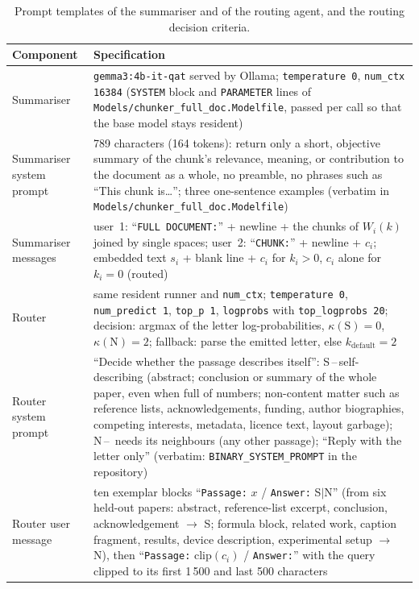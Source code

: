 \documentclass[pdflatex,sn-mathphys-num]{sn-jnl}
\theoremstyle{thmstyleone}%
\theoremstyle{thmstylethree}%
\begin{document}
\begin{table}[htbp]
\caption{Prompt templates of the summariser and of the routing agent, and the routing decision criteria.}\label{tab:prompts}
\begin{tabular}{@{}p{2.6cm}p{10.0cm}@{}}
\toprule
Component & Specification \\
\midrule
Summariser & \texttt{gemma3:4b-it-qat} served by Ollama; \texttt{temperature 0}, \texttt{num\_ctx 16384} (\texttt{SYSTEM} block and \texttt{PARAMETER} lines of \texttt{Models/chunker\_full\_doc.Modelfile}, passed per call so that the base model stays resident) \\
Summariser system prompt & 789 characters (164 tokens): return only a short, objective summary of the chunk's relevance, meaning, or contribution to the document as a whole, no preamble, no phrases such as ``This chunk is\ldots''; three one-sentence examples (verbatim in \texttt{Models/chunker\_full\_doc.Modelfile}) \\
Summariser messages & user~1: ``\texttt{FULL DOCUMENT:}'' + newline + the chunks of $W_i(k)$ joined by single spaces; user~2: ``\texttt{CHUNK:}'' + newline + $c_i$; embedded text $s_i$ + blank line + $c_i$ for $k_i>0$, $c_i$ alone for $k_i=0$ (routed) \\
Router & same resident runner and \texttt{num\_ctx}; \texttt{temperature 0}, \texttt{num\_predict 1}, \texttt{top\_p 1}, \texttt{logprobs} with \texttt{top\_logprobs 20}; decision: argmax of the letter log-probabilities, $\kappa(\mathrm S)=0$, $\kappa(\mathrm N)=2$; fallback: parse the emitted letter, else $k_{\mathrm{default}}=2$ \\
Router system prompt & ``Decide whether the passage describes itself'': S\,--\,self-describing (abstract; conclusion or summary of the whole paper, even when full of numbers; non-content matter such as reference lists, acknowledgements, funding, author biographies, competing interests, metadata, licence text, layout garbage); N\,--\, needs its neighbours (any other passage); ``Reply with the letter only'' (verbatim: \texttt{BINARY\_SYSTEM\_PROMPT} in the repository) \\
Router user message & ten exemplar blocks ``\texttt{Passage:} $x$ / \texttt{Answer:} S$\mid$N'' (from six held-out papers: abstract, reference-list excerpt, conclusion, acknowledgement $\to$ S; formula block, related work, caption fragment, results, device description, experimental setup $\to$ N), then ``\texttt{Passage:} $\mathrm{clip}(c_i)$ / \texttt{Answer:}'' with the query clipped to its first 1\,500 and last 500 characters \\

\end{tabular}
\end{table}
\end{document}
